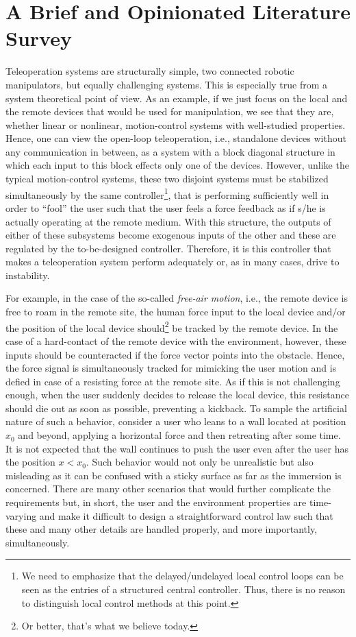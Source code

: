 \chapter{A Brief and Opinionated Literature Survey}%
\label{chap:litsurvey}

Teleoperation systems are structurally simple, two connected robotic manipulators, but equally challenging 
systems. This is especially true from a system theoretical point of view. As an example, 
if we just focus on the local and the remote devices that would be used for manipulation, 
we see that they are, whether linear or nonlinear, motion-control systems with well-studied 
properties. Hence, one can view the open-loop teleoperation, i.e., standalone devices without any communication
in between, as a system with a block diagonal structure in which each input to this block effects only one 
of the devices. However, unlike the typical motion-control systems, these two disjoint 
systems must be stabilized simultaneously by the same controller\footnote{We need to emphasize 
that the delayed/undelayed local control loops can be seen as the entries of a structured 
central controller. Thus, there is no reason to distinguish local control methods at this 
point.}, that is performing sufficiently well in order to \enquote{fool} the user such that the 
user feels a force feedback as if s/he is actually operating at the remote medium. With this 
structure, the outputs of either of these subsystems become exogenous inputs of the other 
and these are regulated by the to-be-designed controller. Therefore, it is this controller 
that makes a teleoperation system perform adequately or, as in many cases, drive to instability.


For example, in the case of the so-called \emph{free-air motion}, i.e., the remote device is free 
to roam in the remote site, the human force input to the local device and/or the position of the 
local device should\footnote{Or better, that's what we believe today.} 
be tracked by the remote device. In the case of a hard-contact of the remote device with the environment, however, 
these inputs should be counteracted if the force vector points into the obstacle. Hence, the force signal is 
simultaneously tracked for mimicking the user motion and is defied in case of a resisting force at the remote 
site. As if this is not challenging enough, when the user suddenly decides to release the local device, this 
resistance should die out as soon as possible, preventing a kickback. To sample the artificial nature of such 
a behavior, consider a user who leans to a wall located at position $x_0$ and beyond, applying a horizontal 
force and then retreating after some time. It is not expected that the wall continues to push the user even 
after the user has the position $x<x_0$. Such behavior would not only be unrealistic but also misleading as 
it can be confused with a sticky surface as far as the immersion is concerned. There are many other scenarios 
that would further complicate the requirements but, in short, the user and the environment properties are 
time-varying and make it difficult to design a straightforward control law such that these and many other details 
are handled properly, and more importantly, simultaneously. 


